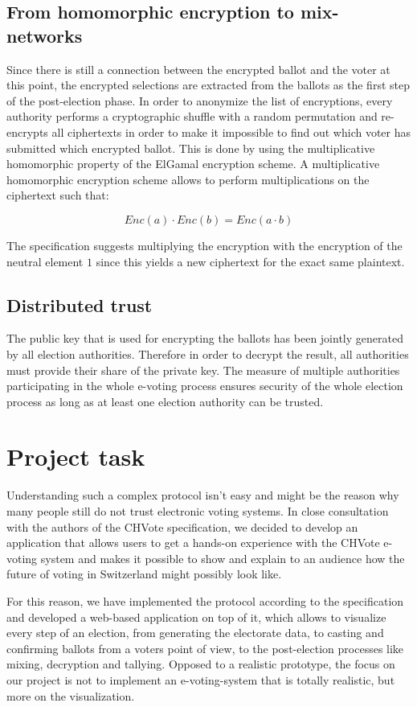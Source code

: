 \subsection{From homomorphic encryption to mix-networks}

Since there is still a connection between the encrypted ballot and the voter at this point, the encrypted selections are extracted from the ballots as the first step of the post-election phase. In order to anonymize the list of encryptions, every authority performs a cryptographic shuffle with a random permutation and re-encrypts all ciphertexts in order to make it impossible to find out which voter has submitted which encrypted ballot. This is done by using the multiplicative homomorphic property of the ElGamal encryption scheme. A multiplicative homomorphic encryption scheme allows to perform multiplications on the ciphertext such that:

\begin{equation*}Enc(a) \cdot Enc(b) = Enc(a \cdot b)\end{equation*}

The specification suggests multiplying the encryption with the encryption of the neutral element $1$ since this yields a new ciphertext for the exact same plaintext.

\subsection{Distributed trust}
The public key that is used for encrypting the ballots has been jointly generated by all election authorities. Therefore in order to decrypt the result, all authorities must provide their share of the private key. The measure of multiple authorities participating in the whole e-voting process ensures security of the whole election process as long as at least one election authority can be trusted.

\section{Project task}

Understanding such a complex protocol isn't easy and might be the reason why many people still do not trust electronic voting systems. In close consultation with the authors of the CHVote specification, we decided to develop an application that allows users to get a hands-on experience with the CHVote e-voting system and makes it possible to show and explain to an audience how the future of voting in Switzerland might possibly look like.

For this reason, we have implemented the protocol according to the specification and developed a web-based application on top of it, which allows to visualize every step of an election, from generating the electorate data, to casting and confirming ballots from a voters point of view, to the post-election processes like mixing, decryption and tallying. Opposed to a realistic prototype, the focus on our project is not to implement an e-voting-system that is totally realistic, but more on the visualization.  